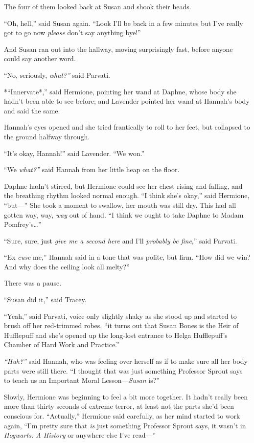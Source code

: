 The four of them looked back at Susan and shook their heads.

``Oh, hell,'' said Susan again. ``Look I'll be back in a few minutes but
I've really got to go now \emph{please} don't say anything bye!''

And Susan ran out into the hallway, moving surprisingly fast, before
anyone could say another word.

``No, seriously, \emph{what?''} said Parvati.

*``Innervate*,'' said Hermione, pointing her wand at Daphne, whose body
she hadn't been able to see before; and Lavender pointed her wand at
Hannah's body and said the same.

Hannah's eyes opened and she tried frantically to roll to her feet, but
collapsed to the ground halfway through.

``It's okay, Hannah!'' said Lavender. ``We won.''

``We \emph{what?''} said Hannah from her little heap on the floor.

Daphne hadn't stirred, but Hermione could see her chest rising and
falling, and the breathing rhythm looked normal enough. ``I think she's
okay,'' said Hermione, ``but---'' She took a moment to swallow, her
mouth was still dry. This had all gotten way, way, \emph{way} out of
hand. ``I think we ought to take Daphne to Madam Pomfrey's\ldots{}''

``Sure, sure, just \emph{give me a second here} and I'll \emph{probably
be fine},'' said Parvati.

``Ex \emph{cuse} me,'' Hannah said in a tone that was polite, but firm.
``How did we win? And why does the ceiling look all melty?''

There was a pause.

``Susan did it,'' said Tracey.

``Yeah,'' said Parvati, voice only slightly shaky as she stood up and
started to brush off her red-trimmed robes, ``it turns out that Susan
Bones is the Heir of Hufflepuff and she's opened up the long-lost
entrance to Helga Hufflepuff's Chamber of Hard Work and Practice.''

\emph{``Huh?''} said Hannah, who was feeling over herself as if to make
sure all her body parts were still there. ``I thought that was just
something Professor Sprout says to teach us an Important Moral
Lesson---\emph{Susan} is?''

Slowly, Hermione was beginning to feel a bit more together. It hadn't
really been more than thirty seconds of extreme terror, at least not the
parts she'd been conscious for. ``Actually,'' Hermione said carefully,
as her mind started to work again, ``I'm pretty sure that \emph{is} just
something Professor Sprout says, it wasn't in \emph{Hogwarts: A History}
or anywhere else I've read---''

